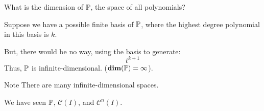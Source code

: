 \documentclass{beamer}
\begin{document}
\begin{frame}
\begin{example}
What is the dimension of $\mathbb{P}$, the space of all polynomials?\pause

\vspace{0.25cm}
Suppose we have a possible finite basis of $\mathbb{P}$, where the highest degree polynomial in this basis is $k$.\pause

\vspace{0.25cm}
But, there would be no way, using the basis to generate:
\begin{equation*}
t^{k+1}
\end{equation*}\pause
Thus, $\mathbb{P}$ is infinite-dimensional. ($\operatorname{\textbf{dim}}(\mathbb{P})=\infty$).
\end{example}\pause

\begin{block}{Note}
There are many infinite-dimensional spaces.

\vspace{2mm}
We have seen $\mathbb{P}$, $\mathcal{C}(I)$, and $\mathcal{C}^n(I)$.
\end{block}
\end{frame}
\end{document}
